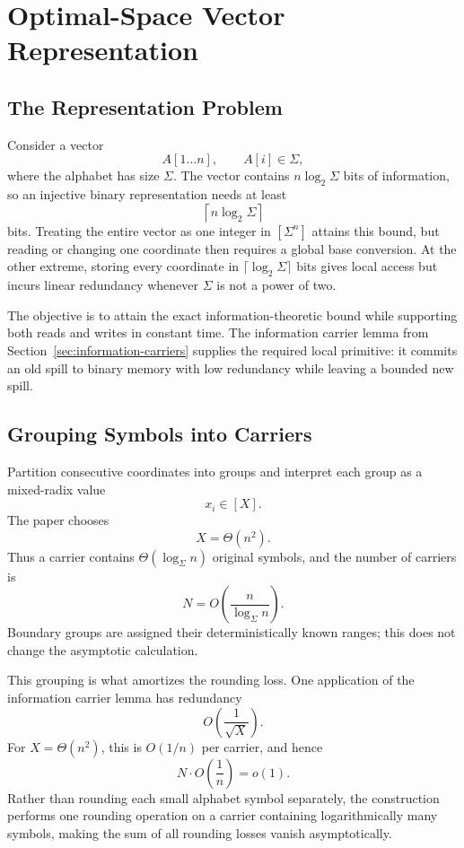 \section{Optimal-Space Vector Representation}
\label{sec:vector-representation}

\subsection{The Representation Problem}

Consider a vector
\[
    A[1\ldots n],
    \qquad
    A[i]\in\Sigma,
\]
where the alphabet has size \(\Sigma\). The vector contains
\(n\log_2\Sigma\) bits of information, so an injective binary
representation needs at least
\[
    \left\lceil n\log_2\Sigma\right\rceil
\]
bits. Treating the entire vector as one integer in \([\Sigma^n]\) attains
this bound, but reading or changing one coordinate then requires a global
base conversion. At the other extreme, storing every coordinate in
\(\lceil\log_2\Sigma\rceil\) bits gives local access but incurs linear
redundancy whenever \(\Sigma\) is not a power of two.

The objective is to attain the exact information-theoretic bound while
supporting both reads and writes in constant time. The information carrier
lemma from Section~\ref{sec:information-carriers} supplies the required local
primitive: it commits an old spill to binary memory with low redundancy while
leaving a bounded new spill.

\subsection{Grouping Symbols into Carriers}

Partition consecutive coordinates into groups and interpret each group as a
mixed-radix value
\[
    x_i\in[X].
\]
The paper chooses
\[
    X=\Theta(n^2).
\]
Thus a carrier contains \(\Theta(\log_{\Sigma}n)\) original symbols, and the
number of carriers is
\[
    N=O\left(\frac{n}{\log_{\Sigma}n}\right).
\]
Boundary groups are assigned their deterministically known ranges; this does
not change the asymptotic calculation.

This grouping is what amortizes the rounding loss. One application of the
information carrier lemma has redundancy
\[
    O\left(\frac{1}{\sqrt X}\right).
\]
For \(X=\Theta(n^2)\), this is \(O(1/n)\) per carrier, and hence
\[
    N\cdot O\left(\frac{1}{n}\right)=o(1).
\]
Rather than rounding each small alphabet symbol separately, the construction
performs one rounding operation on a carrier containing logarithmically many
symbols, making the sum of all rounding losses vanish asymptotically.

